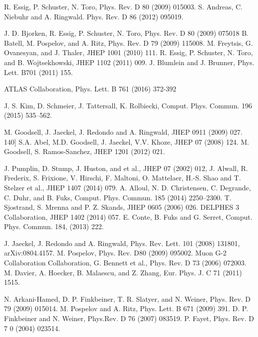 \documentclass{article}
\begin{document}
\begin{thebibliography}
R. Essig, P. Schuster, N. Toro, Phys. Rev. D 80 (2009) 015003.
S. Andreas, C. Niebuhr and A. Ringwald. Phys. Rev. D 86 (2012) 095019.

J. D. Bjorken, R. Essig, P. Schuster, N. Toro, Phys. Rev. D 80 (2009) 075018
B. Batell, M. Pospelov, and A. Ritz,  Phys. Rev. D 79 (2009) 115008.
M. Freytsis, G. Ovanesyan, and J. Thaler, JHEP 1001 (2010) 111.
R. Essig, P. Schuster, N. Toro, and B. Wojtsekhowski, JHEP 1102 (2011) 009.
J. Blumlein and J. Brunner, Phys. Lett. B701 (2011) 155.



ATLAS Collaboration, Phys. Lett. B 761 (2016) 372-392

J. S. Kim, D. Schmeier, J. Tattersall, K. Rolbiecki, Comput. Phys. Commun. 196 (2015) 535–562.


M. Goodsell, J. Jaeckel, J. Redondo and A. Ringwald, JHEP 0911 (2009) 027.
140] S.A. Abel, M.D. Goodsell, J. Jaeckel, V.V. Khoze, JHEP 07 (2008) 124.
M. Goodsell, S. Ramos-Sanchez, JHEP 1201 (2012) 021.

J. Pumplin, D. Stump, J. Huston, and et al., JHEP 07 (2002) 012,
J. Alwall, R. Frederix, S. Frixione, V. Hirschi, F. Maltoni, O. Mattelaer, H.-S. Shao and T. Stelzer et al., JHEP 1407 (2014) 079.
A. Alloul, N. D. Christensen, C. Degrande, C. Duhr, and B. Fuks, Comput. Phys. Commun. 185 (2014) 2250–2300.
T. Sjostrand, S. Mrenna and P. Z. Skands, JHEP 0605 (2006) 026.
DELPHES 3 Collaboration, JHEP 1402 (2014) 057.
E. Conte, B. Fuks and G. Serret, Comput. Phys. Commun. 184, (2013) 222.


J. Jaeckel, J. Redondo and A. Ringwald, Phys. Rev. Lett. 101 (2008) 131801, arXiv:0804.4157.
M. Pospelov,  Phys. Rev. D80 (2009) 095002.
Muon G-2 Collaboration Collaboration, G. Bennett et al., Phys. Rev. D 73 (2006) 072003.
M. Davier, A. Hoecker, B. Malaescu, and Z. Zhang, Eur. Phys. J. C 71 (2011) 1515.

N. Arkani-Hamed, D. P. Finkbeiner, T. R. Slatyer, and N. Weiner, Phys. Rev. D 79 (2009) 015014.
M. Pospelov and A. Ritz, Phys. Lett. B 671 (2009) 391.
D. P. Finkbeiner and N. Weiner, Phys.Rev. D 76 (2007) 083519.
P. Fayet, Phys. Rev. D 7 0 (2004) 023514.

\end{thebibliography}
\end{document}

